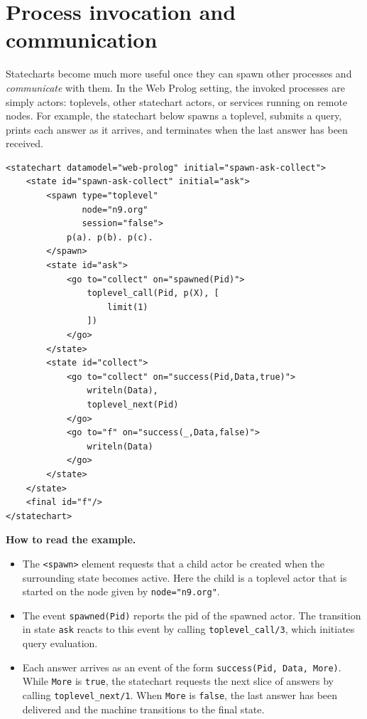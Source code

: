 \section{Process invocation and communication}
\label{sec:invocation-communication}

Statecharts become much more useful once they can spawn other processes and \emph{communicate} with them. In the Web Prolog setting, the invoked processes are simply actors: toplevels, other statechart actors, or services running on remote nodes. For example, the statechart below spawns a toplevel, submits a query, prints each answer as it arrives, and terminates when the last answer has been received.

\begin{verbatim}
<statechart datamodel="web-prolog" initial="spawn-ask-collect">
    <state id="spawn-ask-collect" initial="ask">
        <spawn type="toplevel"
               node="n9.org"
               session="false">
            p(a). p(b). p(c).
        </spawn>
        <state id="ask">
            <go to="collect" on="spawned(Pid)">
                toplevel_call(Pid, p(X), [
                    limit(1)
                ])
            </go>
        </state>
        <state id="collect">
            <go to="collect" on="success(Pid,Data,true)">
                writeln(Data),
                toplevel_next(Pid)
            </go>
            <go to="f" on="success(_,Data,false)">
                writeln(Data)
            </go>
        </state>
    </state>
    <final id="f"/>
</statechart>
\end{verbatim}

\medskip
\noindent\textbf{How to read the example.}
\begin{itemize}
\item The \texttt{<spawn>} element requests that a child actor be created when the surrounding state becomes active. Here the child is a toplevel actor that is started on the node given by \texttt{node="n9.org"}.
\item The event \texttt{spawned(Pid)} reports the pid of the spawned actor. The transition in state \texttt{ask} reacts to this event by calling \texttt{toplevel\_call/3}, which initiates query evaluation.
\item Each answer arrives as an event of the form \texttt{success(Pid,\,Data,\,More)}. While \texttt{More} is \texttt{true}, the statechart requests the next slice of answers by calling \texttt{toplevel\_next/1}. When \texttt{More} is \texttt{false}, the last answer has been delivered and the machine transitions to the final state.
\end{itemize}


